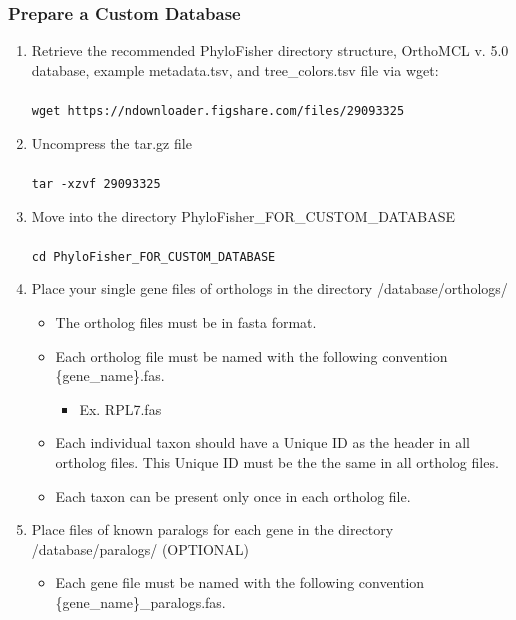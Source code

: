 \documentclass{article}
\def\code#1{\texttt{#1}}
\begin{document}
        \subsubsection{Prepare a Custom Database}
        \label{sec:customdb}
        \begin{enumerate}
            \item Retrieve the recommended PhyloFisher directory structure, OrthoMCL v. 5.0 database, example metadata.tsv, and  tree\_colors.tsv file via wget:
            \\\\
            \code{wget https://ndownloader.figshare.com/files/29093325}
            \item Uncompress the tar.gz file
            \\\\
            \code{tar -xzvf 29093325}
            \item Move into the directory PhyloFisher\_FOR\_CUSTOM\_DATABASE
            \\\\
            \code{cd PhyloFisher\_FOR\_CUSTOM\_DATABASE}\
            \item Place your single gene files of orthologs in the directory /database/orthologs/
            \begin{itemize}
                \item The ortholog files must be in fasta format.
                \item Each ortholog file must be named with the following convention \{gene\_name\}.fas.
                \begin{itemize}
                    \item Ex. RPL7.fas
                \end{itemize}
                \item Each individual taxon should have a Unique ID as the header in all ortholog files. This Unique ID must be the the same in all ortholog files.
                \item Each taxon can be present only once in each ortholog file.
            \end{itemize}
            \item Place files of known paralogs for each gene in the directory /database/paralogs/ (OPTIONAL)
            \begin{itemize}
                \item Each gene file must be named with the following convention \{gene\_name\}\_paralogs.fas.

\end{itemize}
\end{enumerate}
\end{document}
